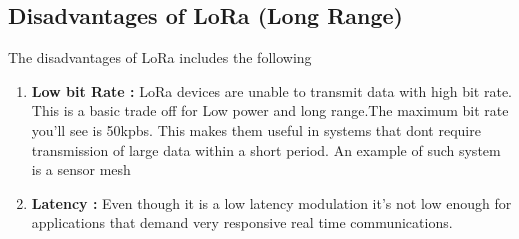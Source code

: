 \subsection{Disadvantages of LoRa (Long Range)}
The disadvantages of LoRa includes the following
\begin{enumerate}
\item \textbf{Low bit Rate :} LoRa devices are unable to transmit data with high bit rate. This is a basic trade off for Low power and long range.The maximum bit rate you’ll see is 50kpbs. This makes them useful in systems that dont require transmission of large data within a short period. An example of such system is a sensor mesh 
\item \textbf{Latency  :} Even though it is a low latency modulation it’s not low enough for applications that demand very responsive real time communications.
\end{enumerate}

